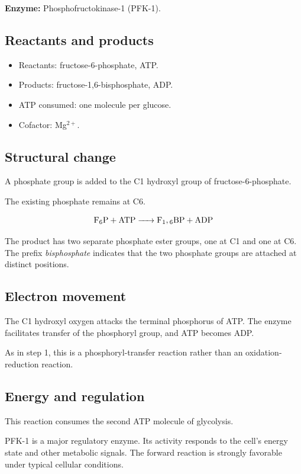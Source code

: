 \documentclass[11pt,a4paper]{article}
\newcommand{\Enz}[1]{\textbf{Enzyme:} #1}
\begin{document}
\Enz{Phosphofructokinase-1 (PFK-1).}

\subsection{Reactants and products}

\begin{itemize}
  \item Reactants: fructose-6-phosphate, ATP.
  \item Products: fructose-1,6-bisphosphate, ADP.
  \item ATP consumed: one molecule per glucose.
  \item Cofactor: Mg$^{2+}$.
\end{itemize}

\subsection{Structural change}

A phosphate group is added to the C1 hydroxyl group of
fructose-6-phosphate.

The existing phosphate remains at C6.

\[
\ce{
F6P + ATP -> F1,6BP + ADP
}
\]

The product has two separate phosphate ester groups, one at C1
and one at C6. The prefix \emph{bisphosphate} indicates that
the two phosphate groups are attached at distinct positions.

\subsection{Electron movement}

The C1 hydroxyl oxygen attacks the terminal phosphorus of ATP.
The enzyme facilitates transfer of the phosphoryl group, and ATP
becomes ADP.

As in step 1, this is a phosphoryl-transfer reaction rather than
an oxidation-reduction reaction.

\subsection{Energy and regulation}

This reaction consumes the second ATP molecule of glycolysis.

PFK-1 is a major regulatory enzyme. Its activity responds to the
cell's energy state and other metabolic signals. The forward reaction
is strongly favorable under typical cellular conditions.
\end{document}
